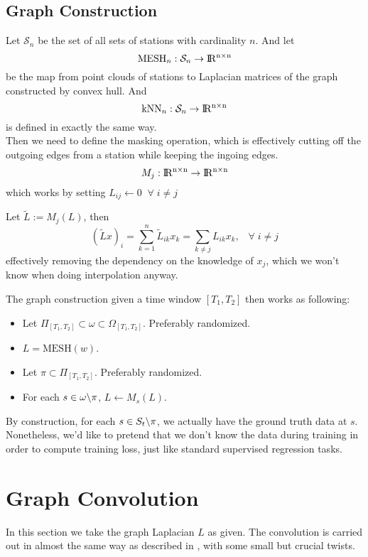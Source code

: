 \documentclass[12pt]{article}
\newcommand\SLASH{\char`\\}
\newcommand{\R}{\ensuremath{
    \rm I\!R}
}
\begin{document}
\subsection{Graph Construction}
Let $\mathcal{S}_n$ be the set of all sets of stations with cardinality $n$. And let 
\[\text{MESH}_n: \mathcal{S}_n \to \R^{n\times n}\]
be the map from point clouds of stations to Laplacian matrices of the graph constructed by convex hull. And 
\[\text{kNN}_n: \mathcal{S}_n \to \R^{n\times n}\]
is defined in exactly the same way. \\

Then we need to define the masking operation, which is effectively cutting off the outgoing edges from a station while keeping the ingoing edges.  
\[M_j: \R^{n\times n}\to \R^{n\times n}\]
which works by setting $L_{ij} \gets 0 \;\; \forall \; i \neq j$

Let $\tilde{L} := M_j(L)$, then
\[(\tilde{L}x)_i = \sum_{k=1}^n \tilde{L}_{ik} x_k = \sum_{k\neq j} L_{ik} x_k, \;\;\; \forall \; i\neq j\]
effectively removing the dependency on the knowledge of $x_j$, which we won't know when doing interpolation anyway. 

The graph construction given a time window $[T_1, T_2]$ then works as following:
\begin{itemize}
    \item Let $\Pi_{[T_1, T_2]} \subset \omega \subset \Omega_{[T_1, T_2]}$. Preferably randomized. 
    \item $L = \text{MESH} (w)$. 
    \item Let $\pi \subset \Pi_{[T_1, T_2]}$. Preferably randomized. 
    \item For each $s\in \omega \SLASH \pi$, $L \gets M_s(L)$.
\end{itemize}
By construction, for each $s\in S_t \SLASH \pi$, we actually have the ground truth data at $s$. Nonetheless, we'd like to pretend that we don't know the data during training in order to compute training loss, just like standard supervised regression tasks. 


\section{Graph Convolution}
In this section we take the graph Laplacian $L$ as given. The convolution is carried out in almost the same way as described in \cite{defferrard2016convolutional}, with some small but crucial twists. 
\end{document}

